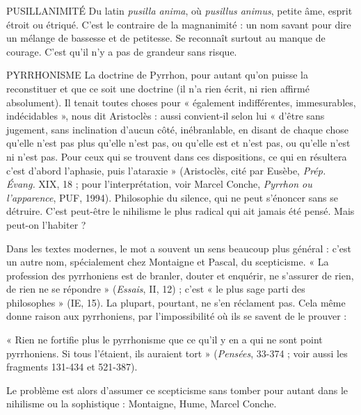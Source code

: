 PUSILLANIMITÉ Du latin {\it pusilla anima}, où {\it pusillus animus}, petite âme,
esprit étroit ou étriqué. C’est le contraire de la
magnanimité : un nom savant pour dire un mélange de bassesse et de petitesse.
Se reconnaît surtout au manque de courage. C’est qu’il n’y a pas de grandeur
sans risque.

PYRRHONISME La doctrine de Pyrrhon, pour autant qu’on puisse la
reconstituer et que ce soit une doctrine (il n’a rien écrit,
ni rien affirmé absolument). Il tenait toutes choses pour « également indifférentes,
immesurables, indécidables », nous dit Aristoclès : aussi convient-il
selon lui « d’être sans jugement, sans inclination d’aucun côté, inébranlable, en
disant de chaque chose qu’elle n’est pas plus qu’elle n’est pas, ou qu’elle est et
n’est pas, ou qu’elle n’est ni n’est pas. Pour ceux qui se trouvent dans ces dispositions,
ce qui en résultera c’est d’abord l’aphasie, puis l’ataraxie » (Aristoclès,
cité par Eusèbe, {\it Prép. Évang.} XIX, 18 ; pour l'interprétation, voir Marcel
Conche, {\it Pyrrhon ou l'apparence}, PUF, 1994). Philosophie du silence, qui ne
peut s’énoncer sans se détruire. C’est peut-être le nihilisme le plus radical qui
ait jamais été pensé. Mais peut-on l’habiter ?

Dans les textes modernes, le mot a souvent un sens beaucoup plus général :
c’est un autre nom, spécialement chez Montaigne et Pascal, du scepticisme.
« La profession des pyrrhoniens est de branler, douter et enquérir, ne s'assurer
de rien, de rien ne se répondre » ({\it Essais}, II, 12) ; c’est « le plus sage parti des
philosophes » (IE, 15). La plupart, pourtant, ne s’en réclament pas. Cela même
donne raison aux pyrrhoniens, par l'impossibilité où ils se savent de le prouver :

« Rien ne fortifie plus le pyrrhonisme que ce qu’il y en a qui ne sont point pyrrhoniens.
Si tous l’étaient, ils auraient tort » ({\it Pensées}, 33-374 ; voir aussi les
fragments 131-434 et 521-387).

Le problème est alors d’assumer ce scepticisme sans tomber pour autant
dans le nihilisme ou la sophistique : Montaigne, Hume, Marcel Conche.
%

